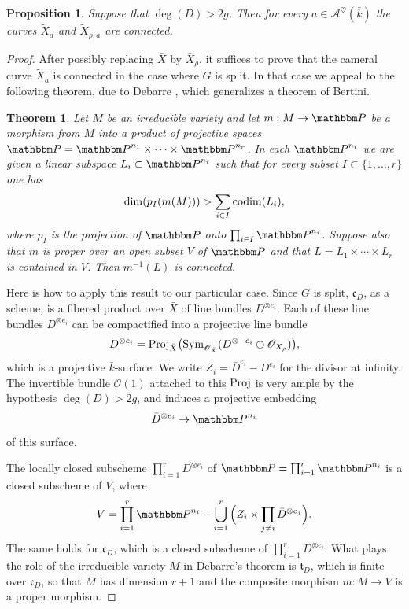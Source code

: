 \documentclass[12pt,english]{smfart}
\numberwithin{equation}{subsection}
\newtheorem{proposition}[equation]{Proposition}
\newtheorem{theoreme}[equation]{Theorem}
\theoremstyle{remark}
\newcommand\calA{{\mathscr A}}
\newcommand\calO{{\mathscr O}}
\newcommand\frakt{{\mathfrak t}}
\newcommand\frakc{{\mathfrak c}}
\newcommand\bbP{{\mathbbm P}}
\begin{document}
\begin{proposition}\label{connexe}
Suppose that $\deg(D)>2g$. Then for every $a\in\calA^\heartsuit(\bar k)$ the curves $\widetilde X_a$ and $\widetilde X_{\rho,a}$ are connected.
\end{proposition}

\begin{proof}
After possibly replacing $\bar X$ by $\bar X_\rho$, it suffices to prove that the cameral curve $\widetilde X_a$ is connected in the case where $G$ is split. In that case we appeal to the following theorem, due to Debarre \cite[th.~1.4]{Deb}, which generalizes a theorem of Bertini.

\begin{theoreme}\label{Debarre}
Let $M$ be an irreducible variety and let $m:M\rightarrow \bbP$ be a morphism from $M$ into a product of projective spaces $\bbP=\bbP^{n_1}\times\cdots\times\bbP^{n_r}$. In each $\bbP^{n_i}$ we are given a linear subspace $L_i\subset \bbP^{n_i}$ such that for every subset $I\subset\{1,\ldots,r\}$ one has
$$\dim(p_I(m(M)))>\sum_{i\in I}{\rm codim}(L_i),$$
where $p_I$ is the projection of $\bbP$ onto $\prod_{i\in I}\bbP^{n_i}$. Suppose also that $m$ is proper over an open subset $V$ of $\bbP$ and that $L=L_1\times\cdots\times L_r$ is contained in $V$. Then $m^{-1}(L)$ is connected.
\end{theoreme}

Here is how to apply this result to our particular case. Since $G$ is split, $\frakc_D$, as a scheme, is a fibered product over $\bar X$ of line bundles $D^{\otimes e_i}$. Each of these line bundles $D^{\otimes e_i}$ can be compactified into a projective line bundle
$$\bar D^{\otimes e_i}={\rm Proj}_{\bar X}\big({\rm Sym}_{\calO_{\bar X}}(D^{\otimes -e_i}\oplus \calO_{X_\rho})\big),$$
which is a projective $\bar k$-surface. We write $Z_i=\bar D^{e_i}-D^{e_i}$ for the divisor at infinity. The invertible bundle $\calO(1)$ attached to this ${\rm Proj}$ is very ample by the hypothesis $\deg(D)>2g$, and induces a projective embedding
$$\bar D^{\otimes e_i}\rightarrow \bbP^{n_i}$$
of this surface.

The locally closed subscheme $\prod_{i=1}^r D^{\otimes e_i}$ of $\bbP=\prod_{i=1}^r \bbP^{n_i}$ is a closed subscheme of $V$, where
$$V=\prod_{i=1}^r \bbP^{n_i}-\bigcup_{i=1}^r\Big(Z_i\times\prod_{j\not=i}\bar D^{\otimes e_j}\Big).$$
The same holds for $\frakc_D$, which is a closed subscheme of $\prod_{i=1}^r D^{\otimes e_i}$. What plays the role of the irreducible variety $M$ in Debarre's theorem is $\frakt_D$, which is finite over $\frakc_D$, so that $M$ has dimension $r+1$ and the composite morphism $m:M\rightarrow V$ is a proper morphism.


\end{proof}
\end{document}
